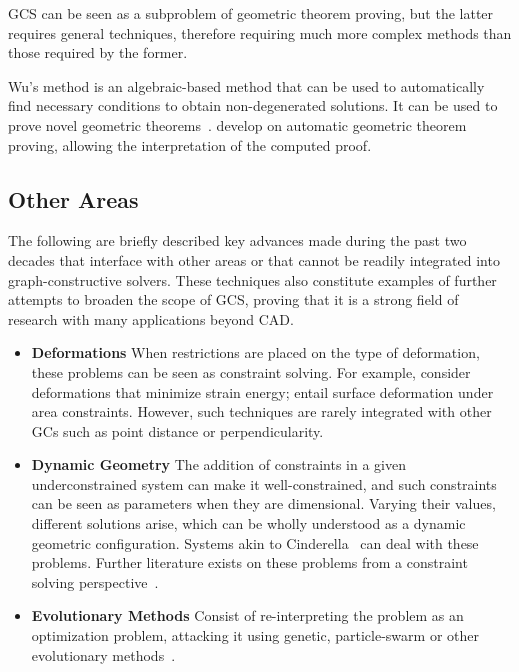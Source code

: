 \ac{GCS} can be seen as a subproblem of geometric theorem proving, but the
latter requires general techniques, therefore requiring much more complex
methods than those required by the former.

Wu's method is an algebraic-based method that can be used to automatically find
necessary conditions to obtain non-degenerated solutions.  It can be used to
prove novel geometric theorems~\cite{Chou:1988:IWMMTPG}.
 develop on automatic geometric
theorem proving, allowing the interpretation of the computed proof.

\subsection{Other Areas}%
\label{sec:intro.constraints.other}

The following are briefly described key advances made during the past two
decades that interface with other areas or that cannot be readily integrated
into graph-constructive solvers.  These techniques also constitute examples of
further attempts to broaden the scope of \ac{GCS}, proving that it is a strong
field of research with many applications beyond \ac{CAD}.

\begin{itemize}
  \item[] \textbf{Deformations} When restrictions are placed on the type of
  deformation, these problems can be seen as constraint solving.  For
  example, \citet{Ahn:2014:GCQBCUML,Bao:2010:BIVCMSE,Moll:2006:PPDLO} consider
  deformations that minimize strain energy;  entail
  surface deformation under area constraints.  However, such techniques are
  rarely integrated with other \acp{GC} such as point distance or
  perpendicularity.
  \item[] \textbf{Dynamic Geometry} The addition of constraints in a given
  underconstrained system can make it well-constrained, and such constraints can
  be seen as parameters when they are dimensional.  Varying their values,
  different solutions arise, which can be wholly understood as a dynamic
  geometric configuration.  Systems akin to
  Cinderella~\cite{Richter:2012:Cinderella.2} can deal with these problems.
  Further literature exists on these problems from a constraint solving
  perspective~\cite{Freixas:2010:CDGS}.
  \item[] \textbf{Evolutionary Methods} Consist of re-interpreting the problem
  as an optimization problem, attacking it using genetic, particle-swarm or
  other evolutionary methods~\cite{Chunhong:2006:PDBOEA,Li:2012:HASPSOASGCP}.
\end{itemize}
